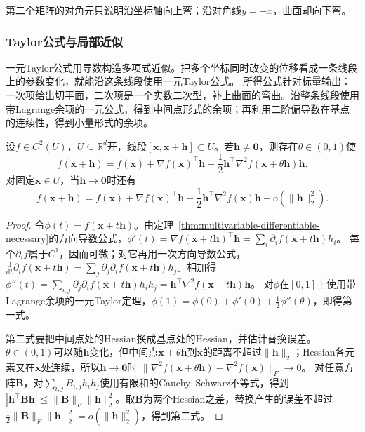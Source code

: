 第二个矩阵的对角元只说明沿坐标轴向上弯；沿对角线$y=-x$，曲面却向下弯。

\subsubsection{Taylor公式与局部近似}

一元Taylor公式用导数构造多项式近似。把多个坐标同时改变的位移看成一条线段上的参数变化，就能沿这条线段使用一元Taylor公式。
所得公式针对标量输出：一次项给出切平面，二次项是一个实数二次型，补上曲面的弯曲。沿整条线段使用带Lagrange余项的一元公式，得到中间点形式的余项；再利用二阶偏导数在基点的连续性，得到小量形式的余项。
\begin{theorem}[多元标量函数的二阶Taylor公式]
\label{thm:multivariable-second-order-taylor}
设$f\in C^2(U)$，$U\subseteq\mathbb R^d$开，线段$[\bm x,\bm x+\bm h]\subset U$。若$\bm h\neq\bm 0$，则存在$\theta\in(0,1)$使
\begin{equation}
 f(\bm x+\bm h)=f(\bm x)+\nabla f(\bm x)^\top\bm h
 +\frac12\bm h^\top\nabla^2f(\bm x+\theta\bm h)\bm h.
\label{eq:analysis-second-order-taylor}
\end{equation}
对固定$\bm x\in U$，当$\bm h\to\bm 0$时还有
\begin{equation}
 f(\bm x+\bm h)=f(\bm x)+\nabla f(\bm x)^\top\bm h
 +\frac12\bm h^\top\nabla^2f(\bm x)\bm h+o(\lVert\bm h\rVert_2^2).
\label{eq:analysis-second-order-local-model}
\end{equation}
\end{theorem}
\begin{proof}
令$\phi(t)=f(\bm x+t\bm h)$。由定理~\ref{thm:multivariable-differentiable-necessary}的方向导数公式，$\phi'(t)=\nabla f(\bm x+t\bm h)^\top\bm h=\sum_i\partial_if(\bm x+t\bm h)h_i$。
每个$\partial_if$属于$C^1$，因而可微；对它再用一次方向导数公式，$\frac{\mathrm d}{\mathrm dt}\partial_if(\bm x+t\bm h)=\sum_j\partial_j\partial_if(\bm x+t\bm h)h_j$。相加得$\phi''(t)=\sum_{i,j}\partial_j\partial_if(\bm x+t\bm h)h_ih_j=\bm h^\top\nabla^2f(\bm x+t\bm h)\bm h$。
对$\phi$在$[0,1]$上使用带Lagrange余项的一元Taylor定理，$\phi(1)=\phi(0)+\phi'(0)+\tfrac12\phi''(\theta)$，即得第一式。

第二式要把中间点处的Hessian换成基点处的Hessian，并估计替换误差。$\theta\in(0,1)$可以随$\bm h$变化，但中间点$\bm x+\theta\bm h$到$\bm x$的距离不超过$\lVert\bm h\rVert_2$；Hessian各元素又在$\bm x$处连续，所以$\bm h\to\bm 0$时
$\lVert\nabla^2f(\bm x+\theta\bm h)-\nabla^2f(\bm x)\rVert_F\to0$。
对任意方阵$\bm B$，对$\sum_{i,j}B_{i,j}h_i h_j$使用有限和的Cauchy--Schwarz不等式，得到$|\bm h^\top\bm B\bm h|\leq\lVert\bm B\rVert_F\lVert\bm h\rVert_2^2$。取$\bm B$为两个Hessian之差，替换产生的误差不超过$\tfrac12\lVert\bm B\rVert_F\lVert\bm h\rVert_2^2=o(\lVert\bm h\rVert_2^2)$，得到第二式。
\end{proof}
